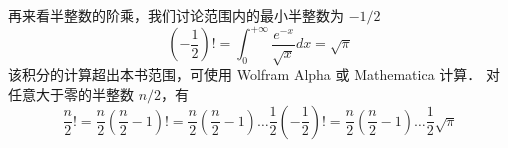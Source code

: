 再来看半整数的阶乘，我们讨论范围内的最小半整数为 $-1/2$ 
\begin{equation}
(-\frac 12) ! = \int_0^{ + \infty } {\frac{{{e^{ - x}}}}{{\sqrt x }}dx} = \sqrt{\pi}
\end{equation}
该积分的计算超出本书范围，可使用 Wolfram Alpha 或 Mathematica 计算．%
对任意大于零的半整数 $n/2$，有
\begin{equation}
\frac{n}{2}! = \frac{n}{2} \left(\frac{n}{2}-1 \right)! = \frac{n}{2} \left(\frac{n}{2}-1\right) \dots \frac 12 \left(-\frac 12\right) ! = \frac{n}{2} \left(\frac{n}{2}-1\right) \dots \frac 12 \sqrt{\pi}
\end{equation}














